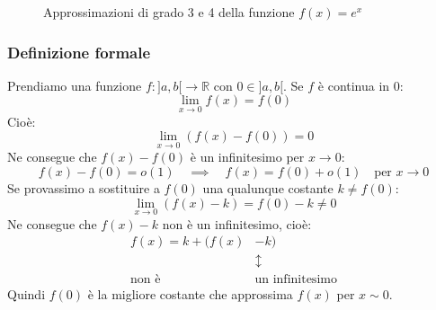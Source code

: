 \begin{figure}
\centering
\begin{subfigure}{0.49\textwidth}
\centering
\end{subfigure}
\begin{subfigure}{0.49\textwidth}
\centering
\end{subfigure}
	\caption{Approssimazioni di grado 3 e 4 della funzione $f(x) = e^x$} 
\label{fig_approxEsponenziale2}
\end{figure}



\subsubsection{Definizione formale}
Prendiamo una funzione $f:]a,b[ \to \mathbb{R}$ con $0 \in ]a,b[$. Se $f$ è 
continua in 0:
\begin{equation*}
	\lim_{x \to 0} f(x) = f(0)
\end{equation*}
Cioè:
\begin{equation*}
	\lim_{x \to 0} (f(x) - f(0)) = 0
\end{equation*}
Ne consegue che $f(x) - f(0)$ è un infinitesimo per $x \to 0$:
\begin{equation*}
	f(x) - f(0) = o(1) \quad \implies \quad f(x) = f(0) + o(1) \quad 
    \text{per } x \to 0
\end{equation*}
Se provassimo a sostituire a $f(0)$ una qualunque costante $k \neq f(0)$:
\begin{equation*}
	\lim_{x \to 0} (f(x) - k) = f(0) - k \neq 0
\end{equation*}
Ne consegue che $f(x) - k$ non è un infinitesimo, cioè:
\begin{align*}
	f(x) = k + (f(x) &- k)\\
	&\updownarrow\\
	\text{non è } & \text{un infinitesimo}
\end{align*}
Quindi $f(0)$ è la migliore costante che approssima $f(x)$ per $x \sim 0$.\\

